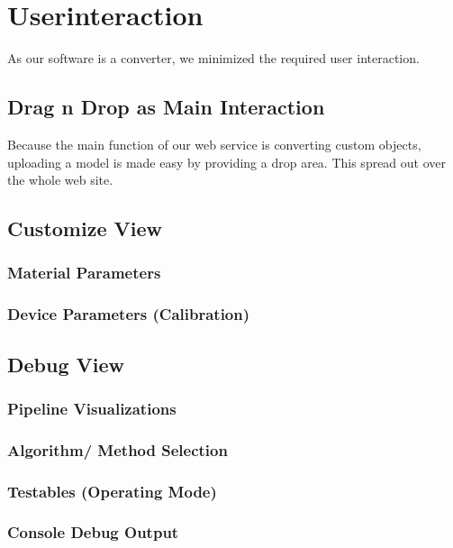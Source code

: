 \documentclass[../ClassicThesis.tex]{subfiles}
\begin{document}
\chapter{Userinteraction}\label{ch:userinteraction}

As our software is a converter, we minimized the required user interaction.

\section{Drag n Drop as Main Interaction}

Because the main function of our web service is converting custom objects, uploading a model is made easy by providing a drop area. This spread out over the whole web site.

\section{Customize View}

\subsection{Material Parameters}
\subsection{Device Parameters (Calibration)}

\section{Debug View}

\subsection{Pipeline Visualizations}
\subsection{Algorithm/ Method Selection}
\subsection{Testables (Operating Mode)}
\subsection{Console Debug Output}
\end{document}
